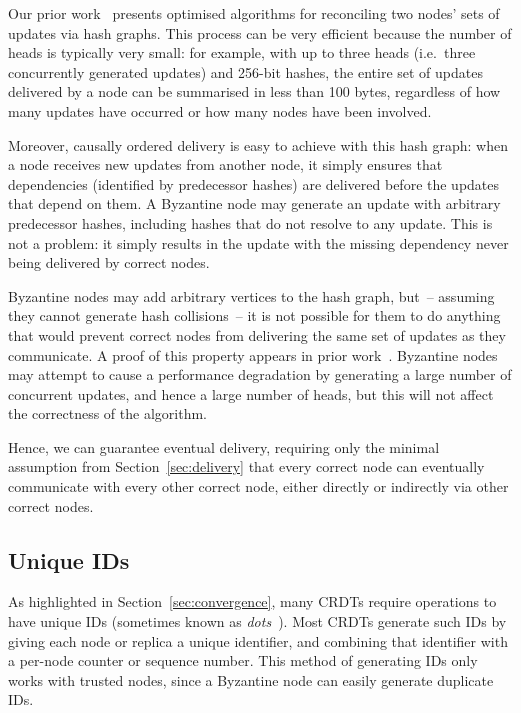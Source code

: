 \documentclass[sigplan,review]{acmart}
\begin{document}
Our prior work~\cite{BECPreprint} presents optimised algorithms for reconciling two nodes' sets of updates via hash graphs.
This process can be very efficient because the number of heads is typically very small: for example, with up to three heads (i.e.\ three concurrently generated updates) and 256-bit hashes, the entire set of updates delivered by a node can be summarised in less than 100 bytes, regardless of how many updates have occurred or how many nodes have been involved.

Moreover, causally ordered delivery is easy to achieve with this hash graph: when a node receives new updates from another node, it simply ensures that dependencies (identified by predecessor hashes) are delivered before the updates that depend on them.
A Byzantine node may generate an update with arbitrary predecessor hashes, including hashes that do not resolve to any update.
This is not a problem: it simply results in the update with the missing dependency never being delivered by correct nodes.

Byzantine nodes may add arbitrary vertices to the hash graph, but~-- assuming they cannot generate hash collisions~-- it is not possible for them to do anything that would prevent correct nodes from delivering the same set of updates as they communicate.
A proof of this property appears in prior work~\cite{BECPreprint}.
Byzantine nodes may attempt to cause a performance degradation by generating a large number of concurrent updates, and hence a large number of heads, but this will not affect the correctness of the algorithm.

Hence, we can guarantee eventual delivery, requiring only the minimal assumption from Section~\ref{sec:delivery} that every correct node can eventually communicate with every other correct node, either directly or indirectly via other correct nodes.

\subsection{Unique IDs}\label{sec:unique-ids}

As highlighted in Section~\ref{sec:convergence}, many CRDTs require operations to have unique IDs (sometimes known as \emph{dots}~\cite{Almeida:2016}).
Most CRDTs generate such IDs by giving each node or replica a unique identifier, and combining that identifier with a per-node counter or sequence number.
This method of generating IDs only works with trusted nodes, since a Byzantine node can easily generate duplicate IDs.
\end{document}
